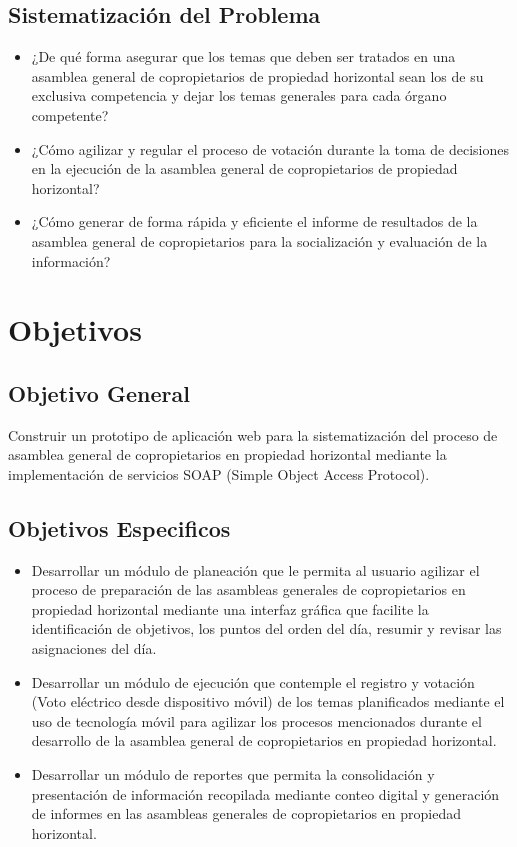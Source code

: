 \subsection{Sistematización del Problema}

\begin{itemize}
\item ¿De qué forma asegurar que los temas que deben ser tratados en una asamblea general de copropietarios de propiedad horizontal sean los de su exclusiva competencia y dejar los temas generales para cada órgano competente?

\item ¿Cómo agilizar y regular el proceso de votación durante la toma de decisiones en la ejecución de la asamblea general de copropietarios de propiedad horizontal?

\item ¿Cómo generar de forma rápida y eficiente el informe de resultados de la asamblea general de copropietarios para la socialización y evaluación de la información?
\end{itemize}


\section{Objetivos}
\subsection{Objetivo General}

Construir un prototipo de aplicación web para la sistematización del proceso de asamblea general de copropietarios en propiedad horizontal mediante la implementación de servicios SOAP (Simple Object Access Protocol).

\subsection{Objetivos Especificos}

\begin{itemize}
  \item Desarrollar un módulo de planeación que le permita al usuario agilizar el proceso de preparación de las asambleas generales de copropietarios en propiedad horizontal mediante una interfaz gráfica que facilite la identificación de objetivos, los puntos del orden del día, resumir y revisar las asignaciones del día.

  \item Desarrollar un módulo de ejecución que contemple el registro y votación (Voto eléctrico desde dispositivo móvil) de los temas planificados mediante el uso de tecnología móvil para agilizar los procesos mencionados durante el desarrollo de la asamblea general de copropietarios en propiedad horizontal.

  \item Desarrollar un módulo de reportes que permita la consolidación y presentación de información recopilada mediante conteo digital y generación de informes en las asambleas generales de copropietarios en propiedad horizontal.

\end{itemize}

